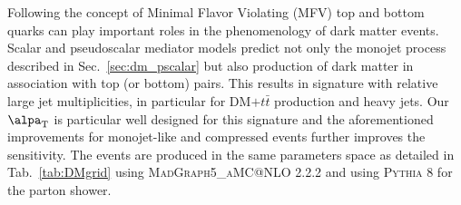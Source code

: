 Following the concept of Minimal Flavor Violating (MFV) top and bottom quarks can play important roles in the phenomenology of dark matter events.
Scalar and pseudoscalar mediator models predict not only the monojet process described in Sec.~\ref{sec:dm_pscalar} but also production of dark matter in association
with top (or bottom) pairs. This results in signature with relative large jet multiplicities, in particular for DM$+t\bar{t}$ production and heavy jets. Our $\alpa_{\textrm{T}}$ is particular well designed for this signature and the aforementioned improvements for monojet-like and compressed events further improves the sensitivity. The events are produced in the same parameters space as detailed in Tab.~\ref{tab:DMgrid} using \textsc{MadGraph5\_aMC@NLO} 2.2.2 and using \textsc{Pythia 8} for the parton shower.



